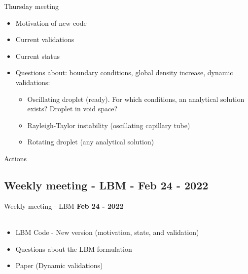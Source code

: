 \documentclass[8pt]{beamer}
\begin{document}
	\begin{frame}{Thursday meeting}
		\begin{itemize}
			\item Motivation of new code
			\item Current validations
			\item Current status
			\item Questions about: boundary conditions, global density increase, dynamic validations:
			\begin{itemize}
				\item Oscillating droplet (ready). For which conditions, an analytical solution exists? Droplet in void space?
				\item Rayleigh-Taylor instability (oscillating capillary tube)
				\item Rotating droplet (any analytical solution)
			\end{itemize}
		\end{itemize}
	\end{frame}
	
	
	
	\begin{frame}{Actions}

	\end{frame}


	\subsection{Weekly meeting - LBM - Feb 24 - 2022}
	\label{}
	\justifying
	\begin{frame}{Weekly meeting - LBM}
		\textbf{Feb 24 - 2022}\\~\\
		\begin{itemize}
			\item LBM Code - New version (motivation, state, and validation)
			
			\item Questions about the LBM formulation
		
			\item Paper (Dynamic validations)
		\end{itemize}
	\end{frame}
	
\end{document}
